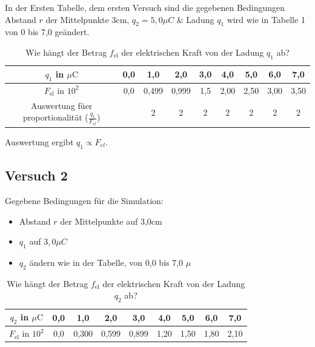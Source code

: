 \documentclass[a4paper]{article}
\begin{document}
In der Ersten Tabelle, dem ersten Versuch sind die gegebenen Bedingungen
Abstand $r$ der Mittelpunkte 3cm, $q_2 =5,0\mu C$ \& Ladung $q_1$ wird wie in
Tabelle 1 von 0 bis 7,0 ge\"andert.

\begin{table}[htpb]
    \centering
    \label{tab:vers1}
    \begin{tabular}{c|cccccccc}
        \toprule
        $q_1$ in $\mu\mathrm{C}$ & 0,0 & 1,0 & 2,0 & 3,0 & 4,0 & 5,0 & 6,0 & 7,0 \\
        \midrule
        $F_{\mathrm{el}}$ in $10^2$ & 0,0 & 0,499 & 0,999 & 1,5 & 2,00 & 2,50 & 3,00 & 3,50 \\
        \midrule
        Auswertung f\"uer proportionalit\"at ($\frac{q_1}{F_{el}}$)&  & 2 & 2& 2& 2& 2& 2& 2\\
        \bottomrule
    \end{tabular}
    \caption{Wie hängt der Betrag $f_{\mathrm{el}}$ der elektrischen Kraft von der Ladung $q_1$ ab?}
\end{table}

Auswertung ergibt $q_1 \propto F_{el}$.


\subsection{Versuch 2}

Gegebene Bedingungen f\"ur die Simulation:
\begin{itemize}
    \item Abstand $r$ der Mittelpunkte auf 3,0cm
    \item $q_1$ auf $3,0\mu C$
    \item $q_2$ \"andern wie in der Tabelle, von 0,0 bis 7,0 $\mu$
\end{itemize}

\begin{table}[htpb]
    \centering
    \label{tab:vers2}
    \begin{tabular}{c|cccccccc}
        \toprule
        $q_2$ in $\mu\mathrm{C}$ & 0,0 & 1,0 & 2,0 & 3,0 & 4,0 & 5,0 & 6,0 & 7,0 \\
        \midrule
        $F_{\mathrm{el}}$ in $10^2$ & 0,0 & 0,300 & 0,599 & 0,899 & 1,20 & 1,50 & 1,80 & 2,10 \\
        \bottomrule
    \end{tabular}
    \caption{Wie hängt der Betrag $f_{\mathrm{el}}$ der elektrischen Kraft von der Ladung $q_2$ ab?}
\end{table}
\end{document}
